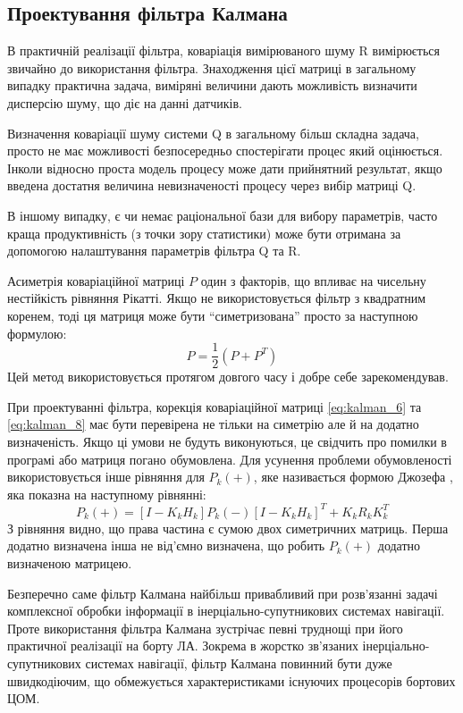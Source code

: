 \subsection{Проектування фільтра Калмана}

В практичній реалізації фільтра, коваріація вимірюваного шуму R вимірюється
звичайно до використання фільтра. Знаходження цієї матриці в загальному випадку
практична задача, виміряні величини дають можливість визначити дисперсію шуму, що
діє на данні датчиків.

Визначення коваріації шуму системи Q в загальному більш складна задача,
просто не має можливості безпосередньо спостерігати процес який оцінюється.
Інколи відносно проста модель процесу може дати прийнятний результат, якщо
введена достатня величина невизначеності процесу через вибір матриці Q.

В іншому випадку, є чи немає раціональної бази для вибору параметрів, часто
краща продуктивність (з точки зору статистики) може бути отримана за допомогою
налаштування параметрів фільтра Q та R. 

Асиметрія коваріаційної матриці $P$ один з факторів, що впливає на чисельну
нестійкість рівняння Рікатті. Якщо не використовується фільтр з квадратним
коренем, тоді ця матриця може бути ``симетризована'' просто за наступною 
формулою:
\begin{equation}
 \label{P_symetry}
P= \frac{1}{2}(P+P^{T})
\end{equation}
Цей метод використовується протягом довгого часу і добре себе зарекомендував.

При проектуванні фільтра, корекція коваріаційної матриці \eqref{eq:kalman_6} та
\eqref{eq:kalman_8} має бути перевірена не тільки на симетрію але й на 
додатно визначеність.
Якщо ці умови не будуть виконуються, це свідчить про помилки в програмі або
матриця погано обумовлена. Для усунення проблеми обумовленості використовується
інше рівняння для $P_{k}(+)$, яке називається формою Джозефа \cite{joseph}, яка показна на
наступному рівнянні:
\begin{equation}
 \label{P_plus_Joseph}
P_{k}(+)=[I-K_{k}H_{k}]P_{k}(-)[I-K_{k}H_{k}]^{T}+K_{k}R_{k}K_{k}^{T}
\end{equation}
З рівняння видно, що права частина є сумою двох симетричних матриць.
Перша додатно визначена інша не від'ємно визначена, що робить $P_{k}(+)$ 
додатно визначеною матрицею.

Безперечно саме фільтр Калмана найбільш привабливий при розв’язанні задачі 
комплексної обробки інформації в інерціально-супутникових системах навігації. 
Проте використання фільтра Калмана зустрічає певні труднощі при його практичної
 реалізації на борту ЛА. Зокрема в жорстко зв’язаних   інерціально-супутникових 
системах навігації,  фільтр Калмана повинний бути дуже швидкодіючим, що обмежується 
характеристиками існуючих процесорів бортових ЦОМ. 




